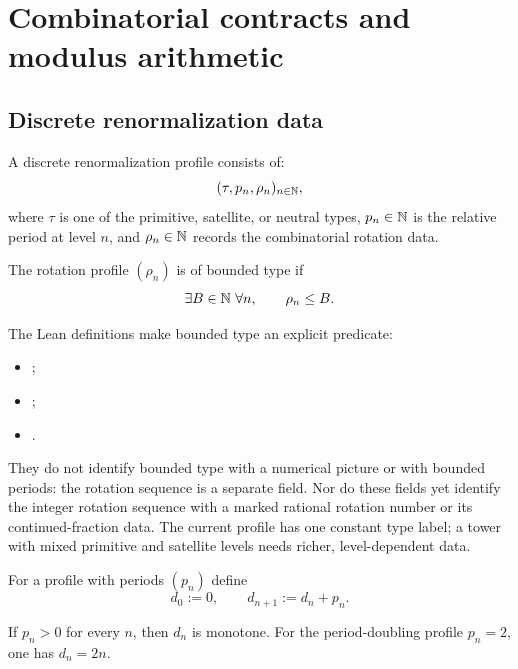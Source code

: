 \chapter{Combinatorial contracts and modulus arithmetic}
\label{chap:combinatorics}

\section{Discrete renormalization data}

\begin{definition}
\label{def:renormalization-profile}
A discrete renormalization profile consists of:
\[
 (\tau,p_n,\rho_n)_{n\in\mathbb N},
\]
where $\tau$ is one of the primitive, satellite, or neutral types,
$p_n\in\mathbb N$ is the relative period at level $n$, and
$\rho_n\in\mathbb N$ records the combinatorial rotation data.
\end{definition}

\begin{definition}
\label{def:bounded-type}
The rotation profile $(\rho_n)$ is of bounded type if
\[
 \exists B\in\N\ \forall n,\qquad \rho_n\le B.
\]
\end{definition}

The Lean definitions make bounded type an explicit predicate:
\begin{itemize}
\item {};
\item {};
\item {}.
\end{itemize}
They do not identify bounded type with a numerical picture or with bounded
periods: the rotation sequence is a separate field.
Nor do these fields yet identify the integer rotation sequence with a
marked rational rotation number or its continued-fraction data.
The current profile has one constant type label; a tower with mixed
primitive and satellite levels needs richer, level-dependent data.

\begin{definition}
\label{def:cumulative-depth}
For a profile with periods $(p_n)$ define
\[
 d_0:=0,\qquad d_{n+1}:=d_n+p_n.
\]
\end{definition}

\begin{theorem}
\label{thm:depth-monotonicity}
If $p_n>0$ for every $n$, then $d_n$ is monotone.  For the period-doubling
profile $p_n=2$, one has $d_n=2n$.
\end{theorem}

